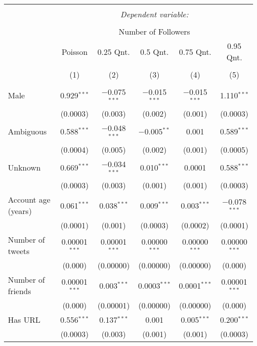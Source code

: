 
\begin{table}[!htbp] \centering 
  \caption{} 
  \label{} 
\begin{tabular}{@{\extracolsep{5pt}}lccccc} 
\\[-1.8ex]\hline 
\hline \\[-1.8ex] 
 & \multicolumn{5}{c}{\textit{Dependent variable:}} \\ 
\cline{2-6} 
\\[-1.8ex] & \multicolumn{5}{c}{Number of Followers} \\ 
 & Poisson & 0.25 Qnt. & 0.5 Qnt. & 0.75 Qnt. & 0.95 Qnt. \\ 
\\[-1.8ex] & (1) & (2) & (3) & (4) & (5)\\ 
\hline \\[-1.8ex] 
 Male & 0.929$^{***}$ & $-$0.075$^{***}$ & $-$0.015$^{***}$ & $-$0.015$^{***}$ & 1.110$^{***}$ \\ 
  & (0.0003) & (0.003) & (0.002) & (0.001) & (0.0003) \\ 
  Ambiguous & 0.588$^{***}$ & $-$0.048$^{***}$ & $-$0.005$^{**}$ & 0.001 & 0.589$^{***}$ \\ 
  & (0.0004) & (0.005) & (0.002) & (0.001) & (0.0005) \\ 
  Unknown & 0.669$^{***}$ & $-$0.034$^{***}$ & 0.010$^{***}$ & 0.0001 & 0.588$^{***}$ \\ 
  & (0.0003) & (0.003) & (0.001) & (0.001) & (0.0003) \\ 
  Account age (years) & 0.061$^{***}$ & 0.038$^{***}$ & 0.009$^{***}$ & 0.003$^{***}$ & $-$0.078$^{***}$ \\ 
  & (0.0001) & (0.001) & (0.0003) & (0.0002) & (0.0001) \\ 
  Number of tweets & 0.00001$^{***}$ & 0.00001$^{***}$ & 0.00000$^{***}$ & 0.00000$^{***}$ & 0.00000$^{***}$ \\ 
  & (0.000) & (0.00000) & (0.00000) & (0.00000) & (0.000) \\ 
  Number of friends & 0.00001$^{***}$ & 0.003$^{***}$ & 0.0003$^{***}$ & 0.0001$^{***}$ & 0.00001$^{***}$ \\ 
  & (0.000) & (0.00001) & (0.00000) & (0.00000) & (0.000) \\ 
  Has URL & 0.556$^{***}$ & 0.137$^{***}$ & 0.001 & 0.005$^{***}$ & 0.200$^{***}$ \\ 
  & (0.0003) & (0.003) & (0.001) & (0.001) & (0.0003) \\ 

\end{tabular}
\end{table}
